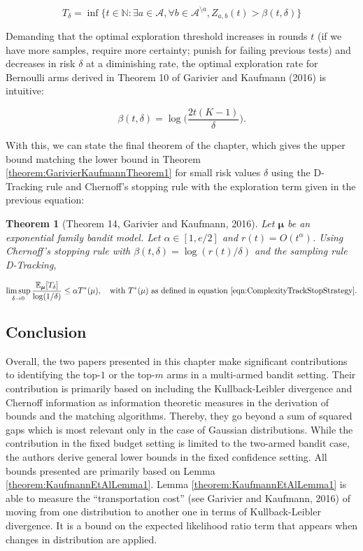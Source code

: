 \documentclass[11pt,]{article}
\newtheorem{theorem}{Theorem}
\begin{document}
\begin{equation*}
T_{\delta} = \inf \{t \in \mathbb{N}: \exists a \in \mathcal{A}, \forall b\in \mathcal{A}^{\setminus a}, Z_{a,b}(t) > \beta(t, \delta)\}
\end{equation*}

Demanding that the optimal exploration threshold increases in rounds
\(t\) (if we have more samples, require more certainty; punish for
failing previous tests) and decreases in risk \(\delta\) at a
diminishing rate, the optimal exploration rate for Bernoulli arms
derived in Theorem 10 of Garivier and Kaufmann (2016) is intuitive:

\begin{equation*}
\beta(t, \delta) = \log \Big(\frac{2t(K-1)}{\delta}\Big).
\end{equation*}

With this, we can state the final theorem of the chapter, which gives
the upper bound matching the lower bound in Theorem
\ref{theorem:GarivierKaufmannTheorem1} for small risk values \(\delta\)
using the D-Tracking rule and Chernoff's stopping rule with the
exploration term given in the previous equation:

\begin{theorem}[Theorem 14, Garivier and Kaufmann, 2016] \label{theorem:GarivierAndKaufmannTheorem14}
Let $\bm{\mu}$ be an exponential family bandit model. Let $\alpha \in [1, e/2]$ and $r(t) = O(t^{\alpha})$. Using Chernoff's stopping rule with $\beta(t,\delta) = \log(r(t)/\delta)$ and the sampling rule D-Tracking,

\begin{equation*}
\limsup_{\delta \to 0} \frac{\mathbb{E}_{\bm{\mu}}[T_{\delta}]}{\log(1/\delta)} \leq \alpha T^*(\mu), \quad \text{with } T^*(\mu) \text{ as defined in equation \ref{eqn:ComplexityTrackStopStrategy}}.
\end{equation*}
\end{theorem}

\subsection{Conclusion}\label{conclusion}

Overall, the two papers presented in this chapter make significant
contributions to identifying the top-\(1\) or the top-\(m\) arms in a
multi-armed bandit setting. Their contribution is primarily based on
including the Kullback-Leibler divergence and Chernoff information as
information theoretic measures in the derivation of bounds and the
matching algorithms. Thereby, they go beyond a sum of squared gaps which
is most relevant only in the case of Gaussian distributions. While the
contribution in the fixed budget setting is limited to the two-armed
bandit case, the authors derive general lower bounds in the fixed
confidence setting. All bounds presented are primarily based on Lemma
\ref{theorem:KaufmannEtAlLemma1}. Lemma \ref{theorem:KaufmannEtAlLemma1}
is able to measure the ``transportation cost'' (see Garivier and
Kaufmann, 2016) of moving from one distribution to another one in terms
of Kullback-Leibler divergence. It is a bound on the expected likelihood
ratio term that appears when changes in distribution are applied.
\end{document}
